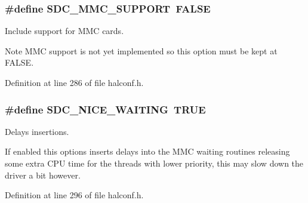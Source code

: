 \hypertarget{group__HAL__CONF_ga4f938eff7370feb8de8411e255d21b01}{}
\subsubsection[{S\+D\+C\+\_\+\+M\+M\+C\+\_\+\+S\+U\+P\+P\+O\+R\+T}]{\setlength{\rightskip}{0pt plus 5cm}\#define S\+D\+C\+\_\+\+M\+M\+C\+\_\+\+S\+U\+P\+P\+O\+R\+T~F\+A\+L\+S\+E}\label{group__HAL__CONF_ga4f938eff7370feb8de8411e255d21b01}


Include support for M\+M\+C cards. 

\begin{DoxyNote}{Note}
M\+M\+C support is not yet implemented so this option must be kept at {\ttfamily F\+A\+L\+S\+E}. 
\end{DoxyNote}


Definition at line 286 of file halconf.\+h.

\hypertarget{group__HAL__CONF_ga3391c832c171a8606b0fc864766f08ba}{}
\subsubsection[{S\+D\+C\+\_\+\+N\+I\+C\+E\+\_\+\+W\+A\+I\+T\+I\+N\+G}]{\setlength{\rightskip}{0pt plus 5cm}\#define S\+D\+C\+\_\+\+N\+I\+C\+E\+\_\+\+W\+A\+I\+T\+I\+N\+G~T\+R\+U\+E}\label{group__HAL__CONF_ga3391c832c171a8606b0fc864766f08ba}


Delays insertions. 

If enabled this options inserts delays into the M\+M\+C waiting routines releasing some extra C\+P\+U time for the threads with lower priority, this may slow down the driver a bit however. 

Definition at line 296 of file halconf.\+h.

\hypertarget{group__HAL__CONF_ga81a9fb00c7a1ce0fe70f263d8fd820e8}{}
